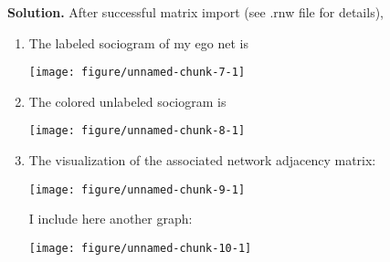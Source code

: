 \documentclass[11pt, oneside]{article}\usepackage[]{graphicx}\usepackage[]{color}
\makeatletter
\def\maxwidth{ %
  \ifdim\Gin@nat@width>\linewidth
    \linewidth
  \else
    \Gin@nat@width
  \fi
}
\newenvironment{knitrout}{}{} %
\newenvironment{solution}{\begin{trivlist} \item \textbf{Solution.}}{\end{trivlist}}
\newenvironment{prob}[2][Problem]{\begin{trivlist}
\item[\hskip \labelsep {\bfseries #1}\hskip \labelsep {\bfseries #2.}]}{\end{trivlist}}
\makeatother
\begin{document}
\begin{prob}{1}
\begin{enumerate}
\begin{solution}
After successful matrix import (see .rnw file for details),
  \begin{enumerate}
  \item The labeled sociogram of my ego net is
  \begin{center}

\begin{knitrout}
\color{fgcolor}

{\centering \texttt{[image: figure/unnamed-chunk-7-1]} 

}



\end{knitrout}
  \end{center}

  \item The colored unlabeled sociogram is
  \begin{center}
\begin{knitrout}
\color{fgcolor}

{\centering \texttt{[image: figure/unnamed-chunk-8-1]} 

}



\end{knitrout}
  \end{center}

  \item The visualization of the associated network adjacency matrix:
  \begin{center}
\begin{knitrout}
\color{fgcolor}

{\centering \texttt{[image: figure/unnamed-chunk-9-1]} 

}



\end{knitrout}
  \end{center}
  I include here another graph:
  \begin{center}
\begin{knitrout}
\color{fgcolor}

{\centering \texttt{[image: figure/unnamed-chunk-10-1]} 

}



\end{knitrout}
  \end{center}
  \end{enumerate}
\end{solution}



\end{enumerate}
\end{prob}
\end{document}
